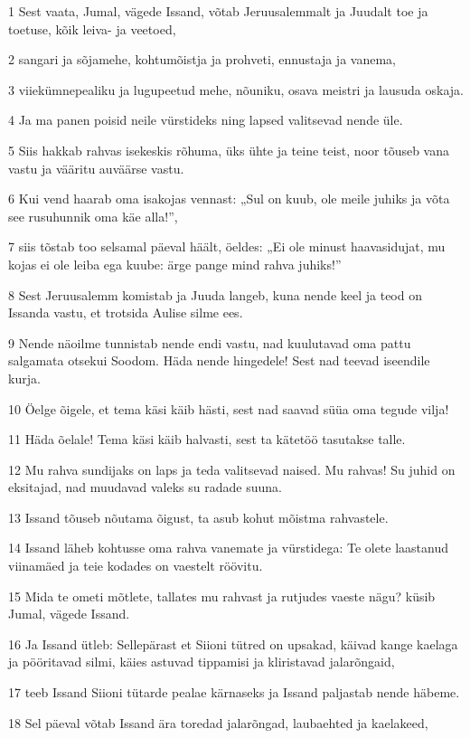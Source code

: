 \par 1 Sest vaata, Jumal, vägede Issand, võtab Jeruusalemmalt ja Juudalt toe ja toetuse, kõik leiva- ja veetoed,
\par 2 sangari ja sõjamehe, kohtumõistja ja prohveti, ennustaja ja vanema,
\par 3 viiekümnepealiku ja lugupeetud mehe, nõuniku, osava meistri ja lausuda oskaja.
\par 4 Ja ma panen poisid neile vürstideks ning lapsed valitsevad nende üle.
\par 5 Siis hakkab rahvas isekeskis rõhuma, üks ühte ja teine teist, noor tõuseb vana vastu ja vääritu auväärse vastu.
\par 6 Kui vend haarab oma isakojas vennast: „Sul on kuub, ole meile juhiks ja võta see rusuhunnik oma käe alla!”,
\par 7 siis tõstab too selsamal päeval häält, öeldes: „Ei ole minust haavasidujat, mu kojas ei ole leiba ega kuube: ärge pange mind rahva juhiks!”
\par 8 Sest Jeruusalemm komistab ja Juuda langeb, kuna nende keel ja teod on Issanda vastu, et trotsida Aulise silme ees.
\par 9 Nende näoilme tunnistab nende endi vastu, nad kuulutavad oma pattu salgamata otsekui Soodom. Häda nende hingedele! Sest nad teevad iseendile kurja.
\par 10 Öelge õigele, et tema käsi käib hästi, sest nad saavad süüa oma tegude vilja!
\par 11 Häda õelale! Tema käsi käib halvasti, sest ta kätetöö tasutakse talle.
\par 12 Mu rahva sundijaks on laps ja teda valitsevad naised. Mu rahvas! Su juhid on eksitajad, nad muudavad valeks su radade suuna.
\par 13 Issand tõuseb nõutama õigust, ta asub kohut mõistma rahvastele.
\par 14 Issand läheb kohtusse oma rahva vanemate ja vürstidega: Te olete laastanud viinamäed ja teie kodades on vaestelt röövitu.
\par 15 Mida te ometi mõtlete, tallates mu rahvast ja rutjudes vaeste nägu? küsib Jumal, vägede Issand.
\par 16 Ja Issand ütleb: Sellepärast et Siioni tütred on upsakad, käivad kange kaelaga ja pööritavad silmi, käies astuvad tippamisi ja kliristavad jalarõngaid,
\par 17 teeb Issand Siioni tütarde pealae kärnaseks ja Issand paljastab nende häbeme.
\par 18 Sel päeval võtab Issand ära toredad jalarõngad, laubaehted ja kaelakeed,
